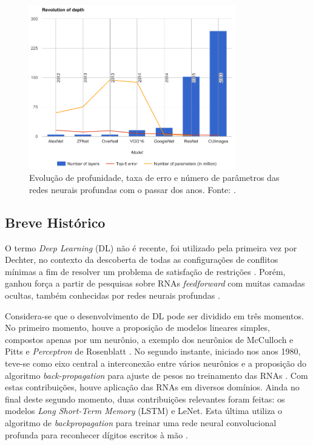 \begin{figure}[ht]
	\centering
	\caption{Evolução de profunidade, taxa de erro e número de parâmetros das redes neurais profundas com o passar dos anos. Fonte: \cite{mediumcnn}.}
	\label{fig:compara_redes}
	\includegraphics[width=0.8\textwidth]{img/compara_redes.png}
\end{figure}

\subsection{Breve Histórico}

O termo \emph{Deep Learning} (DL) não é recente, foi utilizado pela primeira vez por Dechter, no contexto da descoberta de todas as configurações de conflitos mínimas a fim de resolver um problema de satisfação de restrições \cite{dechter1986learning}. Porém, ganhou força a partir de pesquisas sobre RNAs \emph{feedforward} com muitas camadas ocultas, também conhecidas por redes neurais profundas \cite{deng2014deep}.

Considera-se que o desenvolvimento de DL pode ser dividido em três momentos. No primeiro momento, houve a proposição de modelos lineares simples, compostos apenas por um neurônio, a exemplo dos neurônios de McCulloch e Pitts \cite{mcculloch1943logical} e \emph{Perceptron} de Rosenblatt  \cite{rosenblatt1958perceptron}. No segundo instante, iniciado nos anos 1980, teve-se como eixo central a interconexão entre vários neurônios e a proposição do algoritmo \emph{back-propagation} para ajuste de pesos no treinamento das RNAs \cite{rumelhart1986parallel,rumelhart1986backpropagation}. Com estas contribuições, houve aplicação das RNAs em diversos domínios. Ainda no final deste segundo momento, duas contribuições relevantes foram feitas: os modelos \emph{Long Short-Term Memory} (LSTM) e LeNet. Esta última utiliza o algoritmo de \emph{backpropagation} para treinar uma rede neural convolucional profunda para reconhecer dígitos escritos à mão \cite{lenet}.

